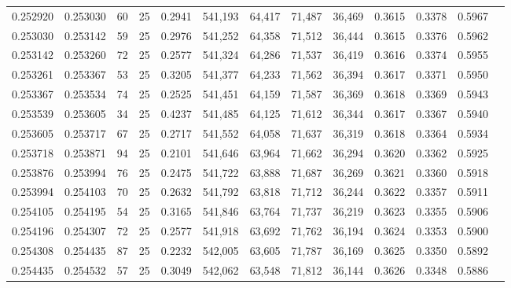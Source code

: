 \begin{tabular}{rrrrrrrrrrrrr}
0.252920 & 0.253030 &    60 &  25 &                                     0.2941 & 541,193 &  64,417 &  71,487 &  36,469 & 0.3615 & 0.3378 & 0.5967 \\
0.253030 & 0.253142 &    59 &  25 &                                     0.2976 & 541,252 &  64,358 &  71,512 &  36,444 & 0.3615 & 0.3376 & 0.5962 \\
0.253142 & 0.253260 &    72 &  25 &                                     0.2577 & 541,324 &  64,286 &  71,537 &  36,419 & 0.3616 & 0.3374 & 0.5955 \\
0.253261 & 0.253367 &    53 &  25 &                                     0.3205 & 541,377 &  64,233 &  71,562 &  36,394 & 0.3617 & 0.3371 & 0.5950 \\
0.253367 & 0.253534 &    74 &  25 &                                     0.2525 & 541,451 &  64,159 &  71,587 &  36,369 & 0.3618 & 0.3369 & 0.5943 \\
0.253539 & 0.253605 &    34 &  25 &                                     0.4237 & 541,485 &  64,125 &  71,612 &  36,344 & 0.3617 & 0.3367 & 0.5940 \\
0.253605 & 0.253717 &    67 &  25 &                                     0.2717 & 541,552 &  64,058 &  71,637 &  36,319 & 0.3618 & 0.3364 & 0.5934 \\
0.253718 & 0.253871 &    94 &  25 &                                     0.2101 & 541,646 &  63,964 &  71,662 &  36,294 & 0.3620 & 0.3362 & 0.5925 \\
0.253876 & 0.253994 &    76 &  25 &                                     0.2475 & 541,722 &  63,888 &  71,687 &  36,269 & 0.3621 & 0.3360 & 0.5918 \\
0.253994 & 0.254103 &    70 &  25 &                                     0.2632 & 541,792 &  63,818 &  71,712 &  36,244 & 0.3622 & 0.3357 & 0.5911 \\
0.254105 & 0.254195 &    54 &  25 &                                     0.3165 & 541,846 &  63,764 &  71,737 &  36,219 & 0.3623 & 0.3355 & 0.5906 \\
0.254196 & 0.254307 &    72 &  25 &                                     0.2577 & 541,918 &  63,692 &  71,762 &  36,194 & 0.3624 & 0.3353 & 0.5900 \\
0.254308 & 0.254435 &    87 &  25 &                                     0.2232 & 542,005 &  63,605 &  71,787 &  36,169 & 0.3625 & 0.3350 & 0.5892 \\
0.254435 & 0.254532 &    57 &  25 &                                     0.3049 & 542,062 &  63,548 &  71,812 &  36,144 & 0.3626 & 0.3348 & 0.5886 \\

\end{tabular}
